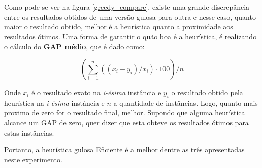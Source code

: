 \documentclass[a4paper, 12pt]{article}
\begin{document}
Como pode-se ver na figura \ref{greedy_compare}, existe uma grande discrepância entre os resultados obtidos 
de uma versão gulosa para outra e nesse caso, quanto maior o resultado obtido, melhor é a heurística
quanto a proximidade aos resultados ótimos. Uma forma de garantir o quão boa é a heurística,
é realizando o cálculo do \textbf{GAP médio}, que é dado como:

\begin{equation} \label{gap_equation}
    (\sum_{i=1}^{n}((x_i-y_i)/x_i)\cdot100) / n
\end{equation}

Onde $x_i$ é o resultado exato na \textit{i-ésima} instância e $y_i$ o resultado obtido pela heurística na \textit{i-ésima} instância e $n$ a quantidade de instâncias. Logo,
quanto mais proximo de zero for o resultado final, melhor. Supondo que alguma heurística alcance um GAP de zero, quer
dizer que esta obteve os resultados ótimos para estas instâncias.


\begin{table}[htbp]
    \centering
\end{table}

Portanto, a heurística gulosa Eficiente é a melhor dentre as três apresentadas neste experimento.
\end{document}
